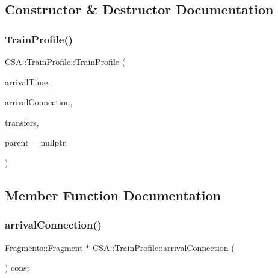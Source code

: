 \subsection{Constructor \& Destructor Documentation}
\mbox{\label{classCSA_1_1TrainProfile_ac939a2e59e0b5ef149225af1b1c4b0f9}} 
\subsubsection{\texorpdfstring{Train\+Profile()}{TrainProfile()}}
{\footnotesize\ttfamily C\+S\+A\+::\+Train\+Profile\+::\+Train\+Profile (\begin{DoxyParamCaption}\item[{const Q\+Date\+Time \&}]{arrival\+Time,  }\item[{\mbox{\hyperlink{classFragments_1_1Fragment}{Fragments\+::\+Fragment}} $\ast$}]{arrival\+Connection,  }\item[{const qint16}]{transfers,  }\item[{Q\+Object $\ast$}]{parent = {\ttfamily nullptr} }\end{DoxyParamCaption})\hspace{0.3cm}{\ttfamily [explicit]}}



\subsection{Member Function Documentation}
\mbox{\label{classCSA_1_1TrainProfile_a2a7907625e22799ad36acc22ef23c7ae}} 
\subsubsection{\texorpdfstring{arrival\+Connection()}{arrivalConnection()}}
{\footnotesize\ttfamily \mbox{\hyperlink{classFragments_1_1Fragment}{Fragments\+::\+Fragment}} $\ast$ C\+S\+A\+::\+Train\+Profile\+::arrival\+Connection (\begin{DoxyParamCaption}{ }\end{DoxyParamCaption}) const}

